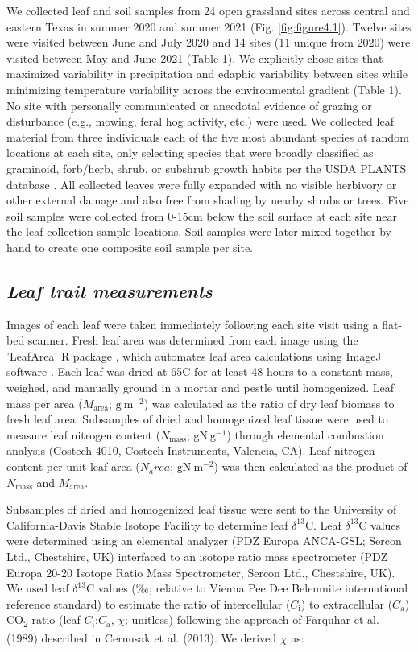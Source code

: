 We collected leaf and soil samples from 24 open grassland sites across central and eastern Texas in summer 2020 and summer 2021 (Fig. \ref{fig:figure4.1}). Twelve sites were visited between June and July 2020 and 14 sites (11 unique from 2020) were visited between May and June 2021 (Table 1). We explicitly chose sites that maximized variability in precipitation and edaphic variability between sites while minimizing temperature variability across the environmental gradient (Table 1). No site with personally communicated or anecdotal evidence of grazing or disturbance (e.g., mowing, feral hog activity, etc.) were used. We collected leaf material from three individuals each of the five most abundant species at random locations at each site, only  selecting species that were broadly classified as graminoid, forb/herb, shrub, or subshrub growth habits per the USDA PLANTS database . All collected leaves were fully expanded with no visible herbivory or other external damage and also free from shading by nearby shrubs or trees. Five soil samples were collected from 0-15cm below the soil surface at each site near the leaf collection sample locations. Soil samples were later mixed together by hand to create one composite soil sample per site.

\subsection{\textit{Leaf trait measurements}}
Images of each leaf were taken immediately following each site visit using a flat-bed scanner. Fresh leaf area was determined from each image using the 'LeafArea' R package , which automates leaf area calculations using ImageJ software . Each leaf was dried at 65\textdegree{}C for at least 48 hours to a constant mass, weighed, and manually ground in a mortar and pestle until homogenized. Leaf mass per area ($M_\mathrm{area}$; $\mathrm{g\ m^{-2}}$) was calculated as the ratio of dry leaf biomass to fresh leaf area. Subsamples of dried and homogenized leaf tissue were used to measure leaf nitrogen content ($N_\mathrm{mass}$; $\mathrm{gN\ g^{-1}}$) through elemental combustion analysis (Costech-4010, Costech Instruments, Valencia, CA). Leaf nitrogen content per unit leaf area ($N_area$; $\mathrm{gN\ m^{-2}}$) was then calculated as the product of $N_\mathrm{mass}$ and $M_\mathrm{area}$.
    
Subsamples of dried and homogenized leaf tissue were sent to the University of California-Davis Stable Isotope Facility to determine leaf $\delta^{13}$C. Leaf $\delta^{13}$C values were determined using an elemental analyzer (PDZ Europa ANCA-GSL; Sercon Ltd., Chestshire, UK) interfaced to an isotope ratio mass spectrometer (PDZ Europa 20-20 Isotope Ratio Mass Spectrometer, Sercon Ltd., Chestshire, UK). We used leaf $\delta^{13}$C values (‰; relative to Vienna Pee Dee Belemnite international reference standard) to estimate the ratio of intercellular ($C_\mathrm{i}$) to extracellular ($C_\mathrm{a}$) CO\textsubscript{2} ratio (leaf $C_\mathrm{i}$:$C_\mathrm{a}$, $\chi$; unitless) following the approach of Farquhar et al. (1989) described in Cernusak et al. (2013). We derived $\chi$ as:

